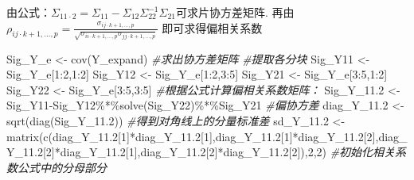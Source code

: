 \documentclass[
]{article}
\newenvironment{Shaded}{\begin{snugshade}}{\end{snugshade}}
\newcommand{\CommentTok}[1]{\textcolor[rgb]{0.56,0.35,0.01}{\textit{#1}}}
\newcommand{\DecValTok}[1]{\textcolor[rgb]{0.00,0.00,0.81}{#1}}
\newcommand{\FloatTok}[1]{\textcolor[rgb]{0.00,0.00,0.81}{#1}}
\newcommand{\FunctionTok}[1]{\textcolor[rgb]{0.00,0.00,0.00}{#1}}
\newcommand{\NormalTok}[1]{#1}
\newcommand{\OtherTok}[1]{\textcolor[rgb]{0.56,0.35,0.01}{#1}}
\newcommand{\SpecialCharTok}[1]{\textcolor[rgb]{0.00,0.00,0.00}{#1}}
\begin{document}
由公式：\(\Sigma_{11\cdot2}=\Sigma_{11}-\Sigma_{12}\Sigma_{22}^{-1}\Sigma_{21}\)可求片协方差矩阵.
再由\(\rho_{ij\cdot k+1,...,p}=\frac{\sigma_{ij\cdot k+1,...,p}}{\sqrt{\sigma_{ii\cdot k+1,...,p}\sigma_{jj\cdot k+1,...,p}}}\)
即可求得偏相关系数

\begin{Shaded}
\begin{Highlighting}[]
\NormalTok{Sig\_Y\_e }\OtherTok{\textless{}{-}} \FunctionTok{cov}\NormalTok{(Y\_expand) }\CommentTok{\#求出协方差矩阵}
\CommentTok{\#提取各分块}
\NormalTok{Sig\_Y11 }\OtherTok{\textless{}{-}}\NormalTok{ Sig\_Y\_e[}\DecValTok{1}\SpecialCharTok{:}\DecValTok{2}\NormalTok{,}\DecValTok{1}\SpecialCharTok{:}\DecValTok{2}\NormalTok{]}
\NormalTok{Sig\_Y12 }\OtherTok{\textless{}{-}}\NormalTok{ Sig\_Y\_e[}\DecValTok{1}\SpecialCharTok{:}\DecValTok{2}\NormalTok{,}\DecValTok{3}\SpecialCharTok{:}\DecValTok{5}\NormalTok{]}
\NormalTok{Sig\_Y21 }\OtherTok{\textless{}{-}}\NormalTok{ Sig\_Y\_e[}\DecValTok{3}\SpecialCharTok{:}\DecValTok{5}\NormalTok{,}\DecValTok{1}\SpecialCharTok{:}\DecValTok{2}\NormalTok{]}
\NormalTok{Sig\_Y22 }\OtherTok{\textless{}{-}}\NormalTok{ Sig\_Y\_e[}\DecValTok{3}\SpecialCharTok{:}\DecValTok{5}\NormalTok{,}\DecValTok{3}\SpecialCharTok{:}\DecValTok{5}\NormalTok{]}
\CommentTok{\#根据公式计算偏相关系数矩阵：}
\NormalTok{Sig\_Y\_11}\FloatTok{.2} \OtherTok{\textless{}{-}}\NormalTok{ Sig\_Y11}\SpecialCharTok{{-}}\NormalTok{Sig\_Y12}\SpecialCharTok{\%*\%}\FunctionTok{solve}\NormalTok{(Sig\_Y22)}\SpecialCharTok{\%*\%}\NormalTok{Sig\_Y21 }\CommentTok{\#偏协方差}
\NormalTok{diag\_Y\_11}\FloatTok{.2} \OtherTok{\textless{}{-}} \FunctionTok{sqrt}\NormalTok{(}\FunctionTok{diag}\NormalTok{(Sig\_Y\_11}\FloatTok{.2}\NormalTok{)) }\CommentTok{\#得到对角线上的分量标准差}
\NormalTok{sd\_Y\_11}\FloatTok{.2} \OtherTok{\textless{}{-}} \FunctionTok{matrix}\NormalTok{(}\FunctionTok{c}\NormalTok{(diag\_Y\_11}\FloatTok{.2}\NormalTok{[}\DecValTok{1}\NormalTok{]}\SpecialCharTok{*}\NormalTok{diag\_Y\_11}\FloatTok{.2}\NormalTok{[}\DecValTok{1}\NormalTok{],diag\_Y\_11}\FloatTok{.2}\NormalTok{[}\DecValTok{1}\NormalTok{]}\SpecialCharTok{*}\NormalTok{diag\_Y\_11}\FloatTok{.2}\NormalTok{[}\DecValTok{2}\NormalTok{],diag\_Y\_11}\FloatTok{.2}\NormalTok{[}\DecValTok{2}\NormalTok{]}\SpecialCharTok{*}\NormalTok{diag\_Y\_11}\FloatTok{.2}\NormalTok{[}\DecValTok{1}\NormalTok{],diag\_Y\_11}\FloatTok{.2}\NormalTok{[}\DecValTok{2}\NormalTok{]}\SpecialCharTok{*}\NormalTok{diag\_Y\_11}\FloatTok{.2}\NormalTok{[}\DecValTok{2}\NormalTok{]),}\DecValTok{2}\NormalTok{,}\DecValTok{2}\NormalTok{) }\CommentTok{\#初始化相关系数公式中的分母部分}

\end{Highlighting}
\end{Shaded}
\end{document}
